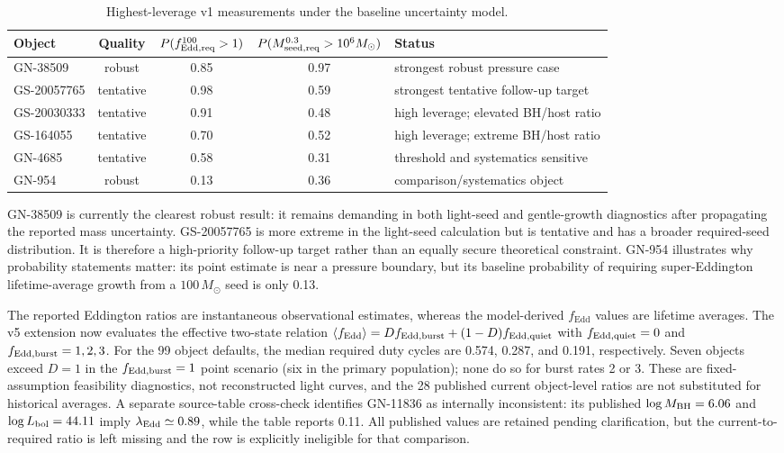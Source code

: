 \documentclass[11pt]{article}
\newcommand{\fedd}{f_{\mathrm{Edd}}}
\begin{document}
\begin{table}[ht]
\centering
\caption{Highest-leverage v1 measurements under the baseline uncertainty model.}
\label{tab:objects}
\small
\begin{tabular}{@{}lcccl@{}}
\toprule
Object & Quality & $P(f_{\rm Edd,req}^{100}>1)$ & $P(M_{\rm seed,req}^{0.3}>10^6M_\odot)$ & Status \\
\midrule
GN-38509 & robust & 0.85 & 0.97 & strongest robust pressure case \\
GS-20057765 & tentative & 0.98 & 0.59 & strongest tentative follow-up target \\
GS-20030333 & tentative & 0.91 & 0.48 & high leverage; elevated BH/host ratio \\
GS-164055 & tentative & 0.70 & 0.52 & high leverage; extreme BH/host ratio \\
GN-4685 & tentative & 0.58 & 0.31 & threshold and systematics sensitive \\
GN-954 & robust & 0.13 & 0.36 & comparison/systematics object \\
\bottomrule
\end{tabular}
\end{table}

GN-38509 is currently the clearest robust result: it remains demanding in both light-seed and gentle-growth diagnostics after propagating the reported mass uncertainty. GS-20057765 is more extreme in the light-seed calculation but is tentative and has a broader required-seed distribution. It is therefore a high-priority follow-up target rather than an equally secure theoretical constraint. GN-954 illustrates why probability statements matter: its point estimate is near a pressure boundary, but its baseline probability of requiring super-Eddington lifetime-average growth from a $100\,M_\odot$ seed is only 0.13.

The reported Eddington ratios are instantaneous observational estimates, whereas the model-derived $\fedd$ values are lifetime averages. The v5 extension now evaluates the effective two-state relation $\langle\fedd\rangle=D f_{\rm Edd,burst}+(1-D)f_{\rm Edd,quiet}$ with $f_{\rm Edd,quiet}=0$ and $f_{\rm Edd,burst}=1,2,3$. For the 99 object defaults, the median required duty cycles are 0.574, 0.287, and 0.191, respectively. Seven objects exceed $D=1$ in the $f_{\rm Edd,burst}=1$ point scenario (six in the primary population); none do so for burst rates 2 or 3. These are fixed-assumption feasibility diagnostics, not reconstructed light curves, and the 28 published current object-level ratios are not substituted for historical averages. A separate source-table cross-check identifies GN-11836 as internally inconsistent: its published $\log M_{\rm BH}=6.06$ and $\log L_{\rm bol}=44.11$ imply $\lambda_{\rm Edd}\simeq0.89$, while the table reports 0.11. All published values are retained pending clarification, but the current-to-required ratio is left missing and the row is explicitly ineligible for that comparison.
\end{document}
